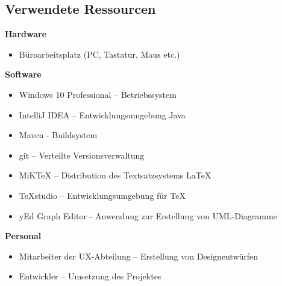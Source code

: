 \subsection{Verwendete Ressourcen}
\label{ressources}

\textbf{Hardware}

\begin{itemize}
\item Büroarbeitsplatz (PC, Tastatur, Maus etc.)
\end{itemize}
 
\textbf{Software}

\begin{itemize}
\item Windows 10 Professional – Betriebssystem
\item IntelliJ IDEA – Entwicklungsumgebung Java
\item Maven - Buildsystem
\item git – Verteilte Versionsverwaltung
\item MiKTeX – Distribution des Textsatzsystems \LaTeX
\item TeXstudio – Entwicklungsumgebung für \TeX
\item yEd Graph Editor - Anwendung zur Erstellung von UML-Diagramme
\end{itemize}

\textbf{Personal}

\begin{itemize}
\item Mitarbeiter der UX-Abteilung – Erstellung von Designentwürfen
\item Entwickler – Umsetzung des Projektes
\end{itemize}